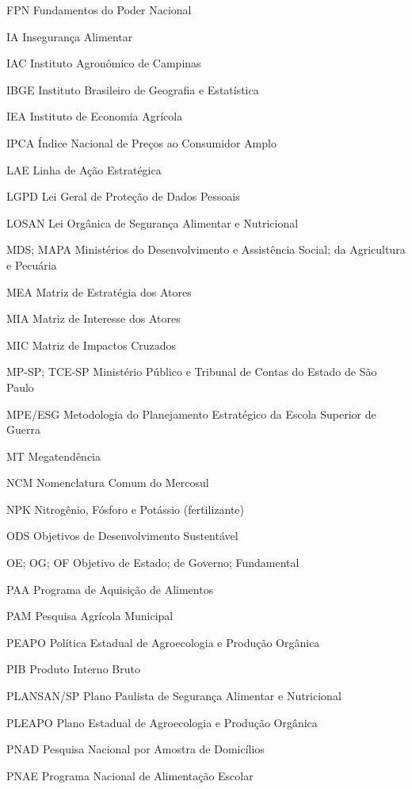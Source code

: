 \documentclass[
	12pt,				%
	openright,			%
	oneside,			%
	a4paper,			%
	chapter=TITLE,		%
	section=TITLE,		%
	english,			%
	french,				%
	spanish,			%
	brazil,				%
 ]{abntex2}
\begin{document}
\begin{siglas}
	\item[FPN] Fundamentos do Poder Nacional
	\item[IA] Insegurança Alimentar
	\item[IAC] Instituto Agronômico de Campinas
	\item[IBGE] Instituto Brasileiro de Geografia e Estatística
	\item[IEA] Instituto de Economia Agrícola
	\item[IPCA] Índice Nacional de Preços ao Consumidor Amplo
	\item[LAE] Linha de Ação Estratégica
	\item[LGPD] Lei Geral de Proteção de Dados Pessoais
	\item[LOSAN] Lei Orgânica de Segurança Alimentar e Nutricional
	\item[MDS; MAPA] Ministérios do Desenvolvimento e Assistência Social; da Agricultura e Pecuária
	\item[MEA] Matriz de Estratégia dos Atores
	\item[MIA] Matriz de Interesse dos Atores
	\item[MIC] Matriz de Impactos Cruzados
	\item[MP-SP; TCE-SP] Ministério Público e Tribunal de Contas do Estado de São Paulo
	\item[MPE/ESG] Metodologia do Planejamento Estratégico da Escola Superior de Guerra
	\item[MT] Megatendência
	\item[NCM] Nomenclatura Comum do Mercosul
	\item[NPK] Nitrogênio, Fósforo e Potássio (fertilizante)
	\item[ODS] Objetivos de Desenvolvimento Sustentável
	\item[OE; OG; OF] Objetivo de Estado; de Governo; Fundamental
	\item[PAA] Programa de Aquisição de Alimentos
	\item[PAM] Pesquisa Agrícola Municipal
	\item[PEAPO] Política Estadual de Agroecologia e Produção Orgânica
	\item[PIB] Produto Interno Bruto
	\item[PLANSAN/SP] Plano Paulista de Segurança Alimentar e Nutricional
	\item[PLEAPO] Plano Estadual de Agroecologia e Produção Orgânica
	\item[PNAD] Pesquisa Nacional por Amostra de Domicílios
	\item[PNAE] Programa Nacional de Alimentação Escolar

\end{siglas}
\end{document}
